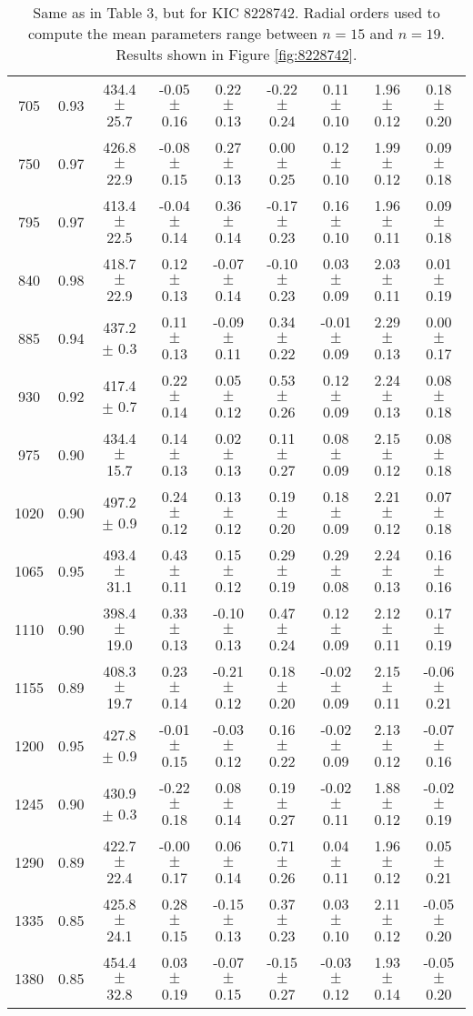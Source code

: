\documentclass[twocolumn]{aastex61}%
\begin{document}
\begin{table*}[ht]
\begin{tabular}{ccc|ccccc|c}
705 & 0.93 & 434.4 $\pm$ 25.7 & -0.05 $\pm$ 0.16 & 0.22 $\pm$ 0.13 & -0.22 $\pm$ 0.24 & 0.11 $\pm$ 0.10 & 1.96 $\pm$ 0.12 & 0.18 $\pm$ 0.20\\
750 & 0.97 & 426.8 $\pm$ 22.9 & -0.08 $\pm$ 0.15 & 0.27 $\pm$ 0.13 & 0.00 $\pm$ 0.25 & 0.12 $\pm$ 0.10 & 1.99 $\pm$ 0.12 & 0.09 $\pm$ 0.18\\
795 & 0.97 & 413.4 $\pm$ 22.5 & -0.04 $\pm$ 0.14 & 0.36 $\pm$ 0.14 & -0.17 $\pm$ 0.23 & 0.16 $\pm$ 0.10 & 1.96 $\pm$ 0.11 & 0.09 $\pm$ 0.18\\
840 & 0.98 & 418.7 $\pm$ 22.9 & 0.12 $\pm$ 0.13 & -0.07 $\pm$ 0.14 & -0.10 $\pm$ 0.23 & 0.03 $\pm$ 0.09 & 2.03 $\pm$ 0.11 & 0.01 $\pm$ 0.19\\
885 & 0.94 & 437.2 $\pm$ 0.3 & 0.11 $\pm$ 0.13 & -0.09 $\pm$ 0.11 & 0.34 $\pm$ 0.22 & -0.01 $\pm$ 0.09 & 2.29 $\pm$ 0.13 & 0.00 $\pm$ 0.17\\
930 & 0.92 & 417.4 $\pm$ 0.7 & 0.22 $\pm$ 0.14 & 0.05 $\pm$ 0.12 & 0.53 $\pm$ 0.26 & 0.12 $\pm$ 0.09 & 2.24 $\pm$ 0.13 & 0.08 $\pm$ 0.18\\
975 & 0.90 & 434.4 $\pm$ 15.7 & 0.14 $\pm$ 0.13 & 0.02 $\pm$ 0.13 & 0.11 $\pm$ 0.27 & 0.08 $\pm$ 0.09 & 2.15 $\pm$ 0.12 & 0.08 $\pm$ 0.18\\
1020 & 0.90 & 497.2 $\pm$ 0.9 & 0.24 $\pm$ 0.12 & 0.13 $\pm$ 0.12 & 0.19 $\pm$ 0.20 & 0.18 $\pm$ 0.09 & 2.21 $\pm$ 0.12 & 0.07 $\pm$ 0.18\\
1065 & 0.95 & 493.4 $\pm$ 31.1 & 0.43 $\pm$ 0.11 & 0.15 $\pm$ 0.12 & 0.29 $\pm$ 0.19 & 0.29 $\pm$ 0.08 & 2.24 $\pm$ 0.13 & 0.16 $\pm$ 0.16\\
1110 & 0.90 & 398.4 $\pm$ 19.0 & 0.33 $\pm$ 0.13 & -0.10 $\pm$ 0.13 & 0.47 $\pm$ 0.24 & 0.12 $\pm$ 0.09 & 2.12 $\pm$ 0.11 & 0.17 $\pm$ 0.19\\
1155 & 0.89 & 408.3 $\pm$ 19.7 & 0.23 $\pm$ 0.14 & -0.21 $\pm$ 0.12 & 0.18 $\pm$ 0.20 & -0.02 $\pm$ 0.09 & 2.15 $\pm$ 0.11 & -0.06 $\pm$ 0.21\\
1200 & 0.95 & 427.8 $\pm$ 0.9 & -0.01 $\pm$ 0.15 & -0.03 $\pm$ 0.12 & 0.16 $\pm$ 0.22 & -0.02 $\pm$ 0.09 & 2.13 $\pm$ 0.12 & -0.07 $\pm$ 0.16\\
1245 & 0.90 & 430.9 $\pm$ 0.3 & -0.22 $\pm$ 0.18 & 0.08 $\pm$ 0.14 & 0.19 $\pm$ 0.27 & -0.02 $\pm$ 0.11 & 1.88 $\pm$ 0.12 & -0.02 $\pm$ 0.19\\
1290 & 0.89 & 422.7 $\pm$ 22.4 & -0.00 $\pm$ 0.17 & 0.06 $\pm$ 0.14 & 0.71 $\pm$ 0.26 & 0.04 $\pm$ 0.11 & 1.96 $\pm$ 0.12 & 0.05 $\pm$ 0.21\\
1335 & 0.85 & 425.8 $\pm$ 24.1 & 0.28 $\pm$ 0.15 & -0.15 $\pm$ 0.13 & 0.37 $\pm$ 0.23 & 0.03 $\pm$ 0.10 & 2.11 $\pm$ 0.12 & -0.05 $\pm$ 0.20\\
1380 & 0.85 & 454.4 $\pm$ 32.8 & 0.03 $\pm$ 0.19 & -0.07 $\pm$ 0.15 & -0.15 $\pm$ 0.27 & -0.03 $\pm$ 0.12 & 1.93 $\pm$ 0.14 & -0.05 $\pm$ 0.20\\
\end{tabular}
\caption{Same as in Table 3, but for KIC 8228742. Radial orders used to compute the mean parameters range between $n=15$ and $n=19$. Results shown in Figure \ref{fig:8228742}.}\label{tab:8228742}
\end{table*}
\end{document}
